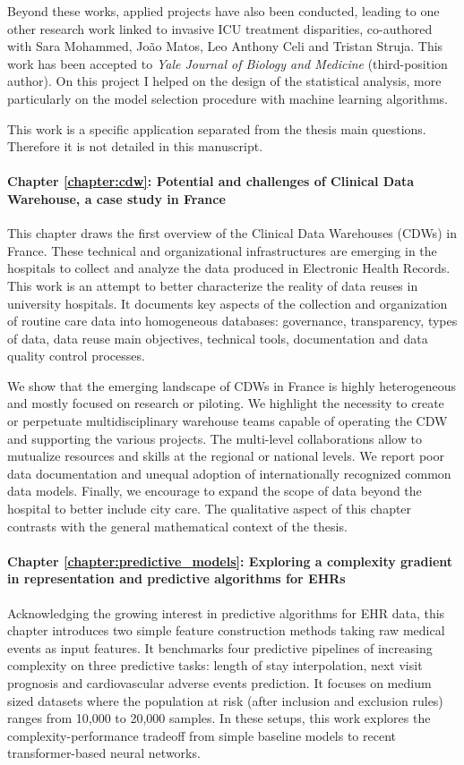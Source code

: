 \documentclass[french,12pt,twoside,a4paper]{book}
\begin{document}
Beyond these works, applied projects have also been conducted, leading to one
other research work linked to invasive ICU treatment disparities, co-authored
with Sara Mohammed, João Matos, Leo Anthony Celi and Tristan Struja. This work
has been accepted to \emph{Yale Journal of Biology and Medicine} (third-position
author). On this project I helped on the design of the statistical analysis,
more particularly on the model selection procedure with machine learning
algorithms.

This work is a specific application separated from the thesis main questions.
Therefore it is not detailed in this manuscript.


\paragraph{Chapter \ref{chapter:cdw}: Potential and challenges of Clinical Data
  Warehouse, a case study in France} This chapter draws the first overview of
the Clinical Data Warehouses (CDWs) in France. These technical and
organizational infrastructures are emerging in the hospitals to collect and
analyze the data produced in Electronic Health Records. This work is an
attempt to better characterize the reality of data reuses in university
hospitals. It documents key aspects of the collection and organization of
routine care data into homogeneous databases: governance, transparency, types
of data, data reuse main objectives, technical tools, documentation and data
quality control processes.

We show that the emerging landscape of CDWs in France is highly heterogeneous
and mostly focused on research or piloting. We highlight the necessity to
create or perpetuate multidisciplinary warehouse teams capable of operating
the CDW and supporting the various projects. The multi-level collaborations
allow to mutualize resources and skills at the regional or national levels. We
report poor data documentation and unequal adoption of internationally
recognized common data models. Finally, we encourage to expand the scope of
data beyond the hospital to better include city care. The qualitative aspect
of this chapter contrasts with the general mathematical context of the thesis.

\paragraph{Chapter \ref{chapter:predictive_models}: Exploring a complexity
  gradient in representation and predictive algorithms for EHRs} Acknowledging
the growing interest in predictive algorithms for EHR data, this chapter
introduces two simple feature construction methods taking raw medical events
as input features. It benchmarks four predictive pipelines of increasing
complexity on three predictive tasks: length of stay interpolation, next visit
prognosis and cardiovascular adverse events prediction. It focuses on medium
sized datasets where the population at risk (after inclusion and exclusion
rules) ranges from 10,000 to 20,000 samples. In these setups, this work
explores the complexity-performance tradeoff from simple baseline models to
recent transformer-based neural networks.
\end{document}
